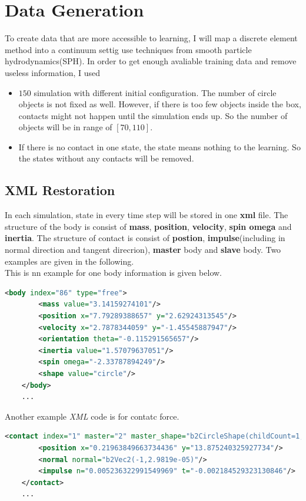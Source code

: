 \section{Data Generation}
To create data that are more accessible to learning, I will map a discrete element method into a continuum settig use techniques from smooth particle hydrodynamics(SPH). In order to get enough avaliable training data and remove useless information, I used
\begin{itemize}
    \item $150$ simulation with different initial configuration. The number of circle objects is not fixed as well. However, if there is too few objects inside the box, contacts might not happen until the simulation ends up. So the number of objects will be in range of $[70, 110]$.
    \item If there is no contact in one state, the state means nothing to the learning. So the states without any contacts will be removed.
\end{itemize}

\subsection{XML Restoration}
In each simulation, state in every time step will be stored in one \textbf{xml} file. The structure of the body is consist of \textbf{mass}, \textbf{position}, \textbf{velocity}, \textbf{spin omega} and \textbf{inertia}. The structure of contact is consist of \textbf{postion}, \textbf{impulse}(including in normal direction and tangent direcrion), \textbf{master} body and \textbf{slave} body. Two examples are given in the following.\\

This is nn example for one body information is given below.
\begin{lstlisting}[language=XML]
    <body index="86" type="free">
        <mass value="3.14159274101"/>
        <position x="7.79289388657" y="2.62924313545"/>
        <velocity x="2.7878344059" y="-1.45545887947"/>
        <orientation theta="-0.115291565657"/>
        <inertia value="1.57079637051"/>
        <spin omega="-2.33787894249"/>
        <shape value="circle"/>
    </body>
    ...
\end{lstlisting}
Another example \textit{XML} code is for contatc force.
\begin{lstlisting}[language=XML]
    <contact index="1" master="2" master_shape="b2CircleShape(childCount=1, pos=b2Vec2(0,0), radius=1.2000000476837158, type=0,)" slave="97" slave_shape="b2CircleShape(childCount=1, pos=b2Vec2(0,0), radius=1.2000000476837158, type=0, )">
        <position x="0.21963849663734436" y="13.875240325927734"/>
        <normal normal="b2Vec2(-1,2.9819e-05)"/>
        <impulse n="0.005236322991549969" t="-0.002184529323130846"/>
    </contact>
    ...
\end{lstlisting}

